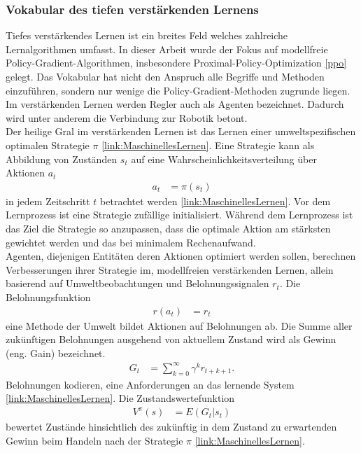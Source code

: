 \subsubsection{Vokabular des tiefen verstärkenden Lernens}
Tiefes verstärkendes Lernen ist ein breites Feld welches zahlreiche Lernalgorithmen umfasst. In dieser Arbeit wurde der Fokus auf modellfreie Policy-Gradient-Algorithmen, insbesondere Proximal-Policy-Optimization \ref{ppo} gelegt. Das Vokabular hat nicht den Anspruch alle Begriffe und Methoden einzuführen, sondern nur wenige die Policy-Gradient-Methoden zugrunde liegen.\\
Im verstärkenden Lernen werden Regler auch als Agenten bezeichnet. Dadurch wird unter anderem die Verbindung zur Robotik betont.\\
Der heilige Gral im verstärkenden Lernen ist das Lernen einer umweltspezifischen optimalen Strategie $\pi$ \ref{link:MaschinellesLernen}. Eine Strategie kann als Abbildung von Zuständen $s_t$ auf eine Wahrscheinlichkeitsverteilung über Aktionen $a_t$
\begin{align}
  a_t &= \pi(s_t)
\end{align}
in jedem Zeitschritt $t$ betrachtet werden \ref{link:MaschinellesLernen}. Vor dem Lernprozess ist eine Strategie zufällige initialisiert. Während dem Lernprozess ist das Ziel die Strategie so anzupassen, dass die optimale Aktion am stärksten gewichtet werden und das bei minimalem Rechenaufwand.\\
Agenten, diejenigen Entitäten deren Aktionen optimiert werden sollen, berechnen Verbesserungen ihrer Strategie im, modellfreien verstärkenden Lernen, allein basierend auf Umweltbeobachtungen und Belohnungssignalen $r_t$. Die Belohnungsfunktion
\begin{align}
  r(a_t) &= r_t
\end{align}
eine Methode der Umwelt bildet Aktionen auf Belohnungen ab. Die Summe aller zukünftigen Belohnungen ausgehend von aktuellem Zustand wird als Gewinn (eng. Gain) bezeichnet. 
\begin{align}
  G_t &= \sum_{k = 0}^{\infty}\gamma ^kr_{t+k+1}. 
\end{align}
Belohnungen kodieren, eine Anforderungen an das lernende System \ref{link:MaschinellesLernen}.
Die Zustandswertefunktion
\begin{align}
  V^\pi(s) &= E(G_t | s_t)
\end{align}
bewertet Zustände hinsichtlich des zukünftig in dem Zustand zu erwartenden Gewinn beim Handeln nach der Strategie $\pi$ \ref{link:MaschinellesLernen}.\\

